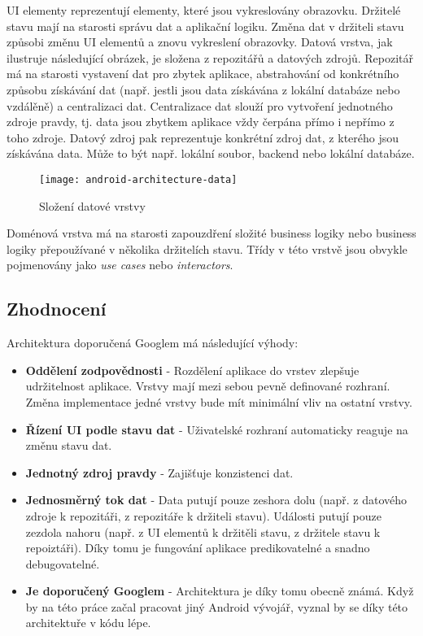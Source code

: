 \noindent UI elementy reprezentují elementy, které jsou vykreslovány obrazovku. Držitelé stavu mají na starosti správu dat a aplikační logiku. Změna dat v držiteli stavu způsobi změnu UI elementů a znovu vykreslení obrazovky. Datová vrstva, jak ilustruje následující obrázek, je složena z repozitářů a datových zdrojů. Repozitář má na starosti vystavení dat pro zbytek aplikace, abstrahování od konkrétního způsobu získávání dat (např. jestli jsou data získávána z lokální databáze nebo vzdálěně) a centralizaci dat.  Centralizace dat slouží pro vytvoření jednotného zdroje pravdy, tj. data jsou zbytkem aplikace vždy čerpána přímo i nepřímo z toho zdroje. Datový zdroj pak reprezentuje konkrétní zdroj dat, z kterého jsou získávána data. Může to být např. lokální soubor, backend nebo lokální databáze. 

\begin{figure}[H]
	\centering
	
	\texttt{[image: android-architecture-data]}
	
	\caption{Složení datové vrstvy \cite{android-architecture}}
	\label{fig:android-architecture-data}
\end{figure}

\noindent Doménová vrstva má na starosti zapouzdření složité business logiky nebo business logiky přepoužívané v několika držitelích stavu. Třídy v této vrstvě jsou obvykle pojmenovány jako \textit{use cases} nebo \textit{interactors}.

\subsection{Zhodnocení}
Architektura doporučená Googlem má následující výhody:

\begin{itemize}
	\item \textbf{Oddělení zodpovědnosti} - Rozdělení aplikace do vrstev zlepšuje udržitelnost aplikace.  Vrstvy mají mezi sebou pevně definované rozhraní. Změna implementace jedné vrstvy bude mít minimální vliv na ostatní vrstvy.
	\item \textbf{Řízení UI podle stavu dat} - Uživatelské rozhraní automaticky reaguje na změnu stavu dat. 
	\item \textbf{Jednotný zdroj pravdy} - Zajišťuje konzistenci dat.
	\item \textbf{Jednosměrný tok dat} - Data putují pouze zeshora dolu (např. z datového zdroje k repozitáři, z repozitáře k držiteli stavu). Události putují pouze zezdola nahoru (např. z UI elementů k držitěli stavu, z držitele stavu k repoiztáři). Díky tomu je fungování aplikace predikovatelné a snadno debugovatelné.
	\item \textbf{Je doporučený Googlem} - Architektura je díky tomu obecně známá. Když by na této práce začal pracovat jiný Android vývojář, vyznal by se díky této architektuře v kódu lépe.
\end{itemize}

